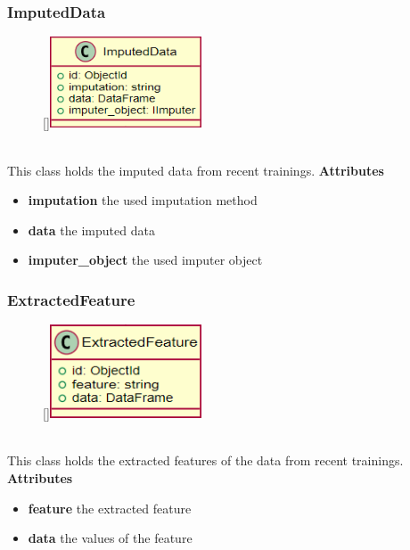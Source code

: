 \newpage
\subsubsection{ImputedData}
\label{ImputedData}
\begin{figure}
    \raisebox{0pt}[\dimexpr{}\baselineskip\relax]{\includegraphics[width=4.5cm]{classes/model-management/16.png}}
\end{figure} 
~\\
This class holds the imputed data from recent trainings.
\newline
\newline
\newline
\newline
\newline
\newline
\textbf{Attributes}
\begin{itemize}
    \item \textbf{imputation} the used imputation method
    \item \textbf{data} the imputed data
    \item \textbf{imputer\_object} the used imputer object
\end{itemize}

\subsubsection{ExtractedFeature}
\label{ExtractedFeature}
\begin{figure}
    \raisebox{0pt}[\dimexpr{}\baselineskip\relax]{\includegraphics[width=4.5cm]{classes/model-management/17.png}}
\end{figure} 
~\\
This class holds the extracted features of the data from recent trainings.
\newline
\newline
\newline
\newline
\newline
\newline
\textbf{Attributes}
\begin{itemize}
    \item \textbf{feature} the extracted feature
    \item \textbf{data} the values of the feature
\end{itemize}
